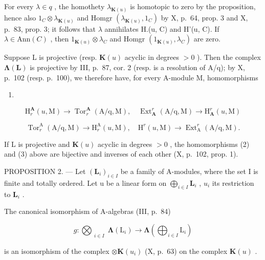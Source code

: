 For every \(\lambda \in q\) , the homothety \(\lambda_{\mathbf{K}(u)}\) is homotopic to zero by the proposition, hence also \(1_{C} \otimes \lambda_{\mathbf{K}(u)}\) and Homgr \((\lambda_{\mathbf{K}(u)}, 1_{C})\) by X, p.~64, prop. 3 and X, p.~83, prop. 3; it follows that \(\lambda\) annihilates H.(u, C) and H'(u, C). If \(\lambda \in \text{Ann}(C)\) , then \(1_{\mathbf{K}(u)} \otimes \lambda_{C}\) and Homgr \((1_{\mathbf{K}(u)}, \lambda_{C})\) are zero.

Suppose L is projective (resp. \(\mathbf{K}(u)\) acyclic in degrees \(>0\) ). Then the complex \(\symbf{\Lambda}(\mathbf{L})\) is projective by III, p.~87, cor. 2 (resp. is a resolution of A/q); by X, p.~102 (resp. p.~100), we therefore have, for every A-module M, homomorphisms

\begin{enumerate}
\def\labelenumi{(\arabic{enumi})}
\setcounter{enumi}{1}
\tightlist
\item
\end{enumerate}

\[
\mathrm{H} _ {r} ^ {\mathbf {A}} (u, \mathrm{M}) \rightarrow \operatorname{Tor} _ {r} ^ {\mathbf {A}} (\mathrm{A} / \mathrm{q}, \mathrm{M}), \quad \operatorname{Ext} _ {\mathbf {A}} ^ {r} (\mathrm{A} / \mathrm{q}, \mathrm{M}) \rightarrow \mathrm{H} _ {\mathbf {A}} ^ {r} (u, \mathrm{M})\tag{3}
\]

\[
\operatorname{Tor} _ {r} ^ {\mathrm{A}} (\mathrm{A} / \mathrm{q}, \mathrm{M}) \rightarrow \mathrm{H} _ {r} ^ {\mathrm{A}} (u, \mathrm{M}), \quad \mathrm{H} ^ {r} (u, \mathrm{M}) \rightarrow \operatorname{Ext} _ {\mathrm{A}} ^ {r} (\mathrm{A} / \mathrm{q}, \mathrm{M}).
\]

If L is projective and \(\mathbf{K}(u)\) acyclic in degrees \(>0\) , the homomorphisms (2) and (3) above are bijective and inverses of each other (X, p.~102, prop. 1).

PROPOSITION 2. --- Let \((\mathbf{L}_{i})_{i\in I}\) be a family of A-modules, where the set I is finite and totally ordered. Let u be a linear form on \(\bigoplus_{i\in I}\mathbf{L}_{i}\) , \(u_{i}\) its restriction to \(\mathbf{L}_{i}\) .

The canonical isomorphism of A-algebras (III, p.~84)

\[
g: \bigotimes_{\substack{i\in I}}\symbf{\Lambda}(\mathrm{L}_{i})\to \symbf{\Lambda}(\bigoplus_{i\in I}\mathrm{L}_{i})
\]

is an isomorphism of the complex \(\otimes \mathbf{K}(u_i)\) (X, p.~63) on the complex \(\mathbf{K}(u)\) .

